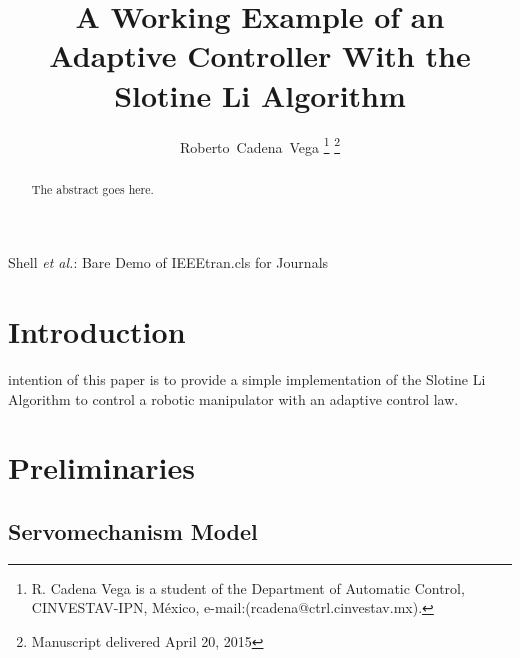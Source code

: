 \documentclass[journal]{IEEEtran}
\begin{document}
%
\title{A Working Example of an Adaptive Controller
    With the Slotine Li Algorithm}

\author{Roberto~Cadena~Vega%
\thanks{R. Cadena Vega is a student of the Department of Automatic Control,
    CINVESTAV-IPN, México, e-mail:(rcadena@ctrl.cinvestav.mx).}%
\thanks{Manuscript delivered April 20, 2015}}

%
{Shell \MakeLowercase{\textit{et al.}}: Bare Demo of IEEEtran.cls for Journals}
% 

\maketitle

\begin{abstract}
The abstract goes here.
\end{abstract}

\section{Introduction}

     intention of this paper is to provide a simple implementation of the Slotine Li Algorithm to control a robotic manipulator with an adaptive control law.

\section{Preliminaries}

    \subsection{Servomechanism Model}
\end{document}
